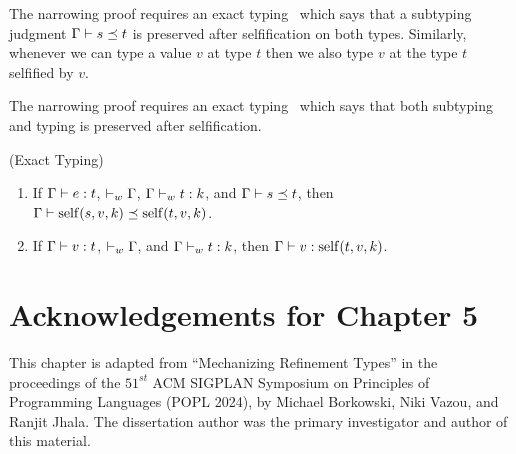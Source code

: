 \begin{fullversion}
The narrowing proof
requires an exact typing~
which says that a subtyping
judgment ${\mathrm{\Gamma}} \vdash s \preceq t$
is preserved after
selfification on both types.
%
Similarly, whenever we can type
a value $v$ at type $t$ then we
also type $v$ at the type $t$
selfified by $v$.
\end{fullversion}
\begin{conference}
    The narrowing proof
    requires an exact typing~
    which says that both subtyping and typing is preserved 
    after selfification.
\end{conference}
\begin{lemma} (Exact Typing) \label{lem:exact}
\begin{enumerate}
  \item If ${\mathrm{\Gamma}} \vdash {e} : {t}$, $\vdash_w {\mathrm{\Gamma}}$, ${\mathrm{\Gamma}} \vdash_w {t} : {k}$, and ${\mathrm{\Gamma}} \vdash s \preceq t$, then ${\mathrm{\Gamma}} \vdash {\rm self}(s, v, k) \preceq {\rm self}(t, v, k)$.
  \item If ${\mathrm{\Gamma}} \vdash {v} : {t}$, $\vdash_w {\mathrm{\Gamma}}$, and ${\mathrm{\Gamma}} \vdash_w {t} : {k}$, then ${\mathrm{\Gamma}} \vdash {v} : {{\rm self}(t, v, k)}$. %
\end{enumerate}
\end{lemma}

\section*{Acknowledgements for Chapter 5}
%
This chapter is adapted from 
``Mechanizing Refinement Types'' in the proceedings of the 
$51^{st}$ ACM SIGPLAN Symposium on Principles of Programming
Languages (POPL 2024), by Michael Borkowski, Niki Vazou, and
Ranjit Jhala.
%
The dissertation author was the primary investigator 
and author of this material.






